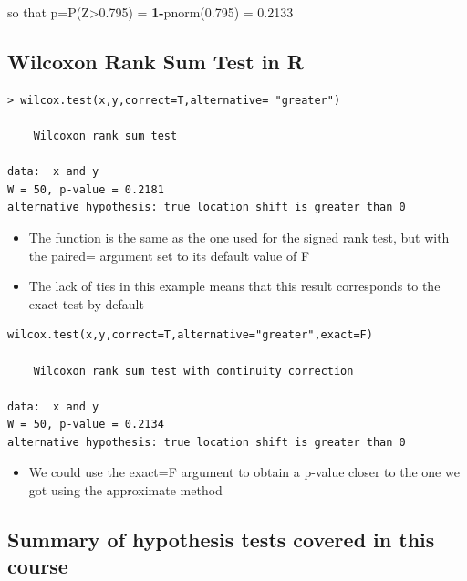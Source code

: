 \documentclass[
]{book}
\providecommand{\tightlist}{%
  \setlength{\itemsep}{0pt}\setlength{\parskip}{0pt}}
\begin{document}
so that p=P(Z\textgreater0.795) = \textbf{1-}pnorm(0.795) = 0.2133

\hypertarget{wilcoxon-rank-sum-test-in-r}{%
\subsection{Wilcoxon Rank Sum Test in R}\label{wilcoxon-rank-sum-test-in-r}}

\begin{verbatim}
> wilcox.test(x,y,correct=T,alternative= "greater")

    Wilcoxon rank sum test

data:  x and y
W = 50, p-value = 0.2181
alternative hypothesis: true location shift is greater than 0
\end{verbatim}

\begin{itemize}
\tightlist
\item
  The function is the same as the one used for the signed rank test, but with the paired= argument set to its default value of F
\item
  The lack of ties in this example means that this result corresponds to the exact test by default
\end{itemize}

\begin{verbatim}
wilcox.test(x,y,correct=T,alternative="greater",exact=F)

    Wilcoxon rank sum test with continuity correction

data:  x and y
W = 50, p-value = 0.2134
alternative hypothesis: true location shift is greater than 0
\end{verbatim}

\begin{itemize}
\tightlist
\item
  We could use the exact=F argument to obtain a p-value closer to the one we got using the approximate method
\end{itemize}

\hypertarget{summary-of-hypothesis-tests-covered-in-this-course}{%
\subsection{Summary of hypothesis tests covered in this course}\label{summary-of-hypothesis-tests-covered-in-this-course}}
\end{document}
